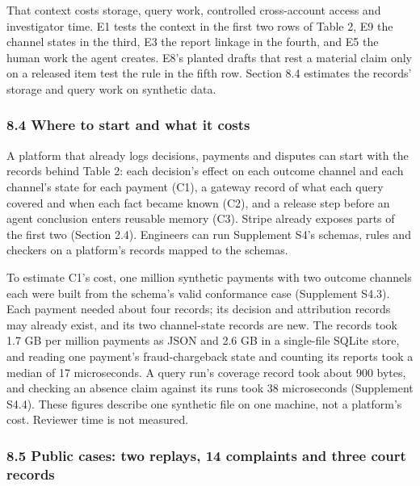 \documentclass[
  11pt,
]{article}
\begin{document}
That context costs storage, query work, controlled cross-account access
and investigator time. E1 tests the context in the first two rows of
Table 2, E9 the channel states in the third, E3 the report linkage in
the fourth, and E5 the human work the agent creates. E8's planted drafts
that rest a material claim only on a released item test the rule in the
fifth row. Section 8.4 estimates the records' storage and query work on
synthetic data.

\hypertarget{where-to-start-and-what-it-costs}{%
\subsubsection{8.4 Where to start and what it
costs}\label{where-to-start-and-what-it-costs}}

A platform that already logs decisions, payments and disputes can start
with the records behind Table 2: each decision's effect on each outcome
channel and each channel's state for each payment (C1), a gateway record
of what each query covered and when each fact became known (C2), and a
release step before an agent conclusion enters reusable memory (C3).
Stripe already exposes parts of the first two (Section 2.4). Engineers
can run Supplement S4's schemas, rules and checkers on a platform's
records mapped to the schemas.

To estimate C1's cost, one million synthetic payments with two outcome
channels each were built from the schema's valid conformance case
(Supplement S4.3). Each payment needed about four records; its decision
and attribution records may already exist, and its two channel-state
records are new. The records took 1.7 GB per million payments as JSON
and 2.6 GB in a single-file SQLite store, and reading one payment's
fraud-chargeback state and counting its reports took a median of 17
microseconds. A query run's coverage record took about 900 bytes, and
checking an absence claim against its runs took 38 microseconds
(Supplement S4.4). These figures describe one synthetic file on one
machine, not a platform's cost. Reviewer time is not measured.

\hypertarget{public-cases-two-replays-14-complaints-and-three-court-records}{%
\subsubsection{8.5 Public cases: two replays, 14 complaints and three
court
records}\label{public-cases-two-replays-14-complaints-and-three-court-records}}
\end{document}
